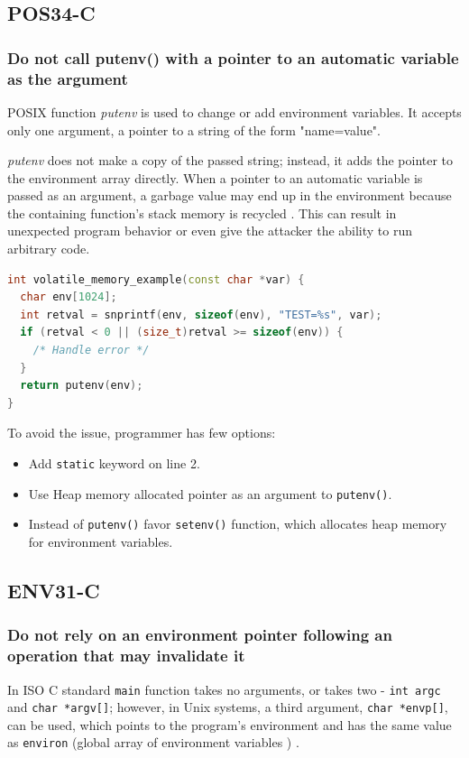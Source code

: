 \subsection{POS34-C}
\subsubsection{Do not call putenv() with a pointer to an automatic variable as the argument}

POSIX \cite{posix} function \emph{putenv} is used to change or add environment variables. It accepts only one argument, a pointer to a string of the form "name=value".

\emph{putenv} does not make a copy of the passed string; instead, it adds the pointer to the environment array directly. 
When a pointer to an automatic variable is passed as an argument, a garbage value may end up in the environment because the containing function's stack memory is recycled \cite{putenv}.
This can result in unexpected program behavior or even give the attacker the ability to run arbitrary code. 

\begin{lstlisting}[language={C++}]
int volatile_memory_example(const char *var) {
  char env[1024];
  int retval = snprintf(env, sizeof(env), "TEST=%s", var);
  if (retval < 0 || (size_t)retval >= sizeof(env)) {
    /* Handle error */
  }
  return putenv(env);
}

\end{lstlisting}

\pagebreak

To avoid the issue, programmer has few options: 
\begin{itemize}
	\item Add \lstinline{static} keyword on line 2. 
	\item Use Heap memory allocated pointer as an argument to \lstinline{putenv()}.
	\item Instead of \lstinline{putenv()} favor \lstinline{setenv()} function, which allocates heap memory for environment variables.
\end{itemize}


\subsection{ENV31-C} \label{env31}
\subsubsection{Do not rely on an environment pointer following an operation that may invalidate it}
In ISO C standard \lstinline{main} function takes no arguments, or takes two - \lstinline{int argc} and \lstinline{char *argv[]}; however, in Unix systems, a third argument, \lstinline{char *envp[]}, can be used, which points to the program's environment and has the same value as \lstinline{environ} (global array of environment variables \cite{environ}) \cite{3main}. 


